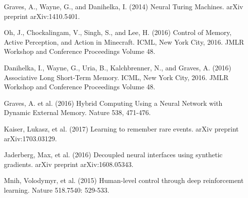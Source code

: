 \documentclass{article}
\begin{document}
\begin{thebibliography}{plain}
Graves, A., Wayne, G., and Danihelka, I. (2014) Neural Turing Machines. arXiv preprint arXiv:1410.5401.

Oh, J., Chockalingam, V., Singh, S., and Lee, H. (2016) Control of Memory, Active Perception, and Action in Minecraft. ICML, New York City, 2016. JMLR Workshop and Conference Proceedings Volume 48.

Danihelka, I., Wayne, G., Uria, B., Kalchbrenner, N., and Graves, A. (2016) Associative Long Short-Term Memory. ICML, New York City, 2016. JMLR Workshop and Conference Proceedings Volume 48.

Graves, A. et al. (2016) Hybrid Computing Using a Neural Network with Dynamic External Memory. Nature 538, 471-476.

Kaiser, Lukasz, et al. (2017) Learning to remember rare events. arXiv preprint arXiv:1703.03129.

Jaderberg, Max, et al. (2016) Decoupled neural interfaces using synthetic gradients. arXiv preprint arXiv:1608.05343.

Mnih, Volodymyr, et al. (2015) Human-level control through deep reinforcement learning. Nature 518.7540: 529-533.
\end{thebibliography}
\end{document}
